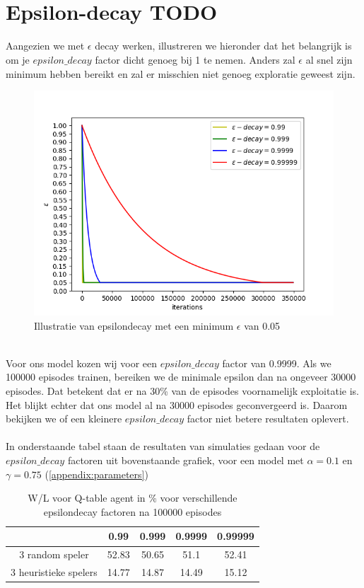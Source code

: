 \documentclass[11pt]{article}
\begin{document}
\section{\\Epsilon-decay TODO}
\label{appendix:epsilon}
Aangezien we met $\epsilon$ decay werken, illustreren we hieronder dat het belangrijk is om je $epsilon\_decay$ factor dicht genoeg bij 1 te nemen. Anders zal $\epsilon$ al snel zijn minimum hebben bereikt en zal er misschien niet genoeg exploratie geweest zijn.\\
\begin{figure}[h]
\centering
\includegraphics[scale=0.5]{images/epsilon_decay.png}
\caption{Illustratie van epsilondecay met een minimum $\epsilon$ van 0.05}
\end{figure}\\
Voor ons model kozen wij voor een $epsilon\_decay$ factor van 0.9999. Als we 100000 episodes trainen, bereiken we de minimale epsilon dan na ongeveer 30000 episodes. Dat betekent dat er na 30\% van de episodes voornamelijk exploitatie is. Het blijkt echter dat ons model al na 30000 episodes geconvergeerd is. Daarom bekijken we of een kleinere $epsilon\_decay$ factor niet betere resultaten oplevert.\\\\
In onderstaande tabel staan de resultaten van simulaties gedaan voor de $epsilon\_decay$ factoren uit bovenstaande grafiek, voor een model met $\alpha = 0.1$ en $\gamma = 0.75$ (\ref{appendix:parameters})
\begin{table}[H]
        \centering
        \begin{tabular}{|c|c|c|c|c|}
                \hline
                                & 0.99&0.999&0.9999&0.99999\\
                                \hline
                3 random speler  &52.83&50.65&51.1&52.41\\
                3 heuristieke spelers      &14.77&14.87&14.49&15.12\\
                \hline
        \end{tabular}
        \caption{W/L voor Q-table agent in \% voor verschillende epsilondecay factoren na 100000 episodes}
\end{table}
\end{document}
